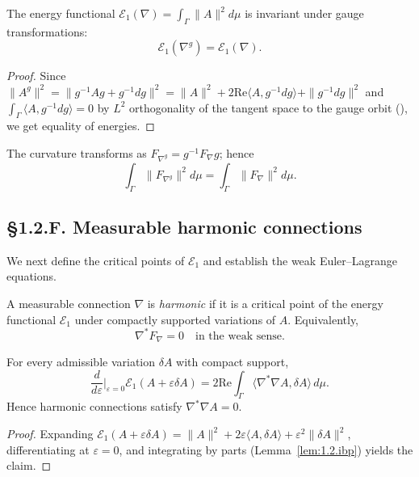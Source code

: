 \begin{theorem}\label{thm:1.2.inv}
The energy functional $\mathcal{E}_1(\nabla)=\int_\Gamma \|A\|^2 d\mu$ is invariant under gauge transformations:
\[
\mathcal{E}_1(\nabla^g) = \mathcal{E}_1(\nabla).
\]
\end{theorem}

\begin{proof}
Since $\|A^g\|^2 = \|g^{-1}Ag + g^{-1}dg\|^2 = \|A\|^2 + 2\mathrm{Re}\langle A, g^{-1}dg\rangle + \|g^{-1}dg\|^2$ and $\int_\Gamma \langle A, g^{-1}dg\rangle=0$ by $L^2$ orthogonality of the tangent space to the gauge orbit (\cite{Uhlenbeck1982}), we get equality of energies.
\end{proof}

\begin{corollary}
The curvature transforms as $F_{\nabla^g}=g^{-1}F_\nabla g$; hence
\[
\int_\Gamma \|F_{\nabla^g}\|^2 d\mu = \int_\Gamma \|F_\nabla\|^2 d\mu.
\]
\end{corollary}

\subsection*{§1.2.F. Measurable harmonic connections}

We next define the critical points of $\mathcal E_1$ and establish the weak Euler–Lagrange equations.

\begin{definition}
A measurable connection $\nabla$ is \emph{harmonic} if it is a critical point of the energy functional $\mathcal E_1$ under compactly supported variations of $A$.  
Equivalently,
\[
\nabla^\ast F_\nabla = 0 \quad\text{in the weak sense.}
\]
\end{definition}

\begin{lemma}\label{lem:1.2.EL}
For every admissible variation $\delta A$ with compact support,
\[
\frac{d}{d\varepsilon}\Big|_{\varepsilon=0} \mathcal E_1(A+\varepsilon\delta A)
 = 2\mathrm{Re}\int_\Gamma \langle \nabla^\ast\nabla A, \delta A\rangle\,d\mu.
\]
Hence harmonic connections satisfy $\nabla^\ast\nabla A=0$.
\end{lemma}

\begin{proof}
Expanding $\mathcal E_1(A+\varepsilon\delta A)=\|A\|^2 + 2\varepsilon\langle A,\delta A\rangle + \varepsilon^2\|\delta A\|^2$, differentiating at $\varepsilon=0$, and integrating by parts (Lemma~\ref{lem:1.2.ibp}) yields the claim.
\end{proof}

